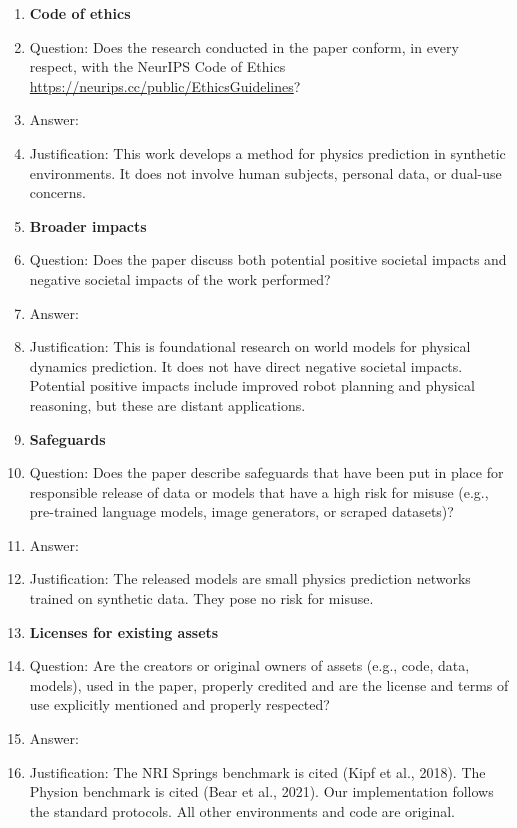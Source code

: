 \begin{enumerate}
\item {\bf Code of ethics}
    \item[] Question: Does the research conducted in the paper conform, in every respect, with the NeurIPS Code of Ethics \url{https://neurips.cc/public/EthicsGuidelines}?
    \item[] Answer: \answerYes{}
    \item[] Justification: This work develops a method for physics prediction in synthetic environments. It does not involve human subjects, personal data, or dual-use concerns.


\item {\bf Broader impacts}
    \item[] Question: Does the paper discuss both potential positive societal impacts and negative societal impacts of the work performed?
    \item[] Answer: \answerNA{}
    \item[] Justification: This is foundational research on world models for physical dynamics prediction. It does not have direct negative societal impacts. Potential positive impacts include improved robot planning and physical reasoning, but these are distant applications.

\item {\bf Safeguards}
    \item[] Question: Does the paper describe safeguards that have been put in place for responsible release of data or models that have a high risk for misuse (e.g., pre-trained language models, image generators, or scraped datasets)?
    \item[] Answer: \answerNA{}
    \item[] Justification: The released models are small physics prediction networks trained on synthetic data. They pose no risk for misuse.

\item {\bf Licenses for existing assets}
    \item[] Question: Are the creators or original owners of assets (e.g., code, data, models), used in the paper, properly credited and are the license and terms of use explicitly mentioned and properly respected?
    \item[] Answer: \answerYes{}
    \item[] Justification: The NRI Springs benchmark is cited (Kipf et al., 2018). The Physion benchmark is cited (Bear et al., 2021). Our implementation follows the standard protocols. All other environments and code are original.


\end{enumerate}

